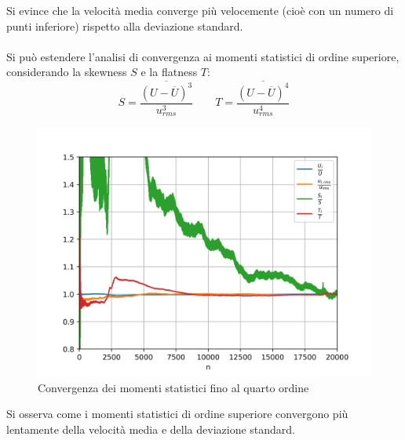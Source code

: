 \noindent Si evince che la velocità media converge più velocemente (cioè con un numero di punti inferiore) rispetto alla deviazione standard.\\\\
Si può estendere l'analisi di convergenza ai momenti statistici di ordine superiore, considerando la skewness $S$ e la flatness $T$:
\begin{equation*}
    S = \frac{\overline{(U-\overline U)^3}}{u_{rms}^3} \qquad T = \frac{\overline{(U-\overline U)^4}}{u_{rms}^4}
\end{equation*}

\begin{figure}[H]
    \centering
    \includegraphics[width=.65\textwidth]{images/10/convall.png}
    \caption{Convergenza dei momenti statistici fino al quarto ordine}
\end{figure}

\noindent Si osserva come i momenti statistici di ordine superiore convergono più lentamente della velocità media e della deviazione standard.
